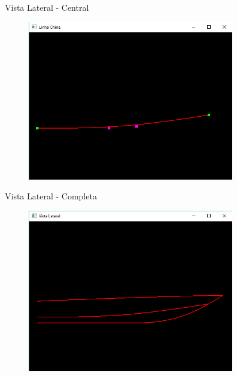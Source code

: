\documentclass{beamer}
\begin{document}
\begin{frame}{Vista Lateral - Central}
\begin{figure}[h]	
\centering
\includegraphics[width=9cm]{linhachine}
\end{figure}
\end{frame}
\begin{frame}{Vista Lateral - Completa}
\begin{figure}[h]	
	\centering
	\includegraphics[width=9cm]{lateralopengl}
\end{figure}
\end{frame}
\end{document}
